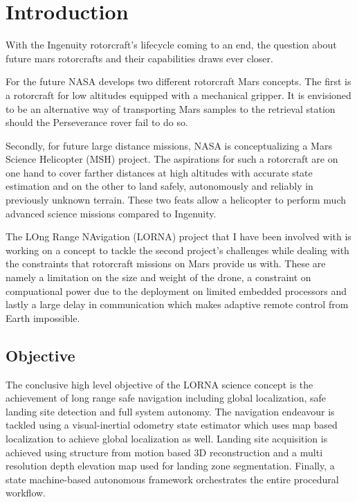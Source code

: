 \chapter{Introduction}
\label{sec:introduction}

With the Ingenuity rotorcraft's lifecycle coming to an end, the question about future mars rotorcrafts and their capabilities draws ever closer.

For the future NASA develops two different rotorcraft Mars concepts. The first is a rotorcraft for low altitudes equipped with a mechanical gripper. It is envisioned to be an alternative way of transporting Mars samples to the retrieval station should the Perseverance rover fail to do so.

Secondly, for future large distance missions, NASA is conceptualizing a Mars Science Helicopter (MSH) project. The aspirations for such a rotorcraft are on one hand to cover farther distances at high altitudes with accurate state estimation and on the other to land safely, autonomously and reliably in previously unknown terrain. These two feats allow a helicopter to perform much advanced science missions compared to Ingenuity. 

The LOng Range NAvigation (LORNA) project that I have been involved with is working on a concept to tackle the second project's challenges while dealing with the constraints that rotorcraft missions on Mars provide us with. These are namely a limitation on the size and weight of the drone, a constraint on compuational power due to the deployment on limited embedded processors and lastly a large delay in communication which makes adaptive remote control from Earth impossible.

\section{Objective}

The conclusive high level objective of the LORNA science concept is the achievement of long range safe navigation including global localization, safe landing site detection and full system autonomy. The navigation endeavour is tackled using a visual-inertial odometry state estimator which uses map based localization to achieve global localization as well. Landing site acquisition is achieved using structure from motion based 3D reconstruction and a multi resolution depth elevation map used for landing zone segmentation. Finally, a state machine-based autonomous framework orchestrates the entire procedural workflow.


